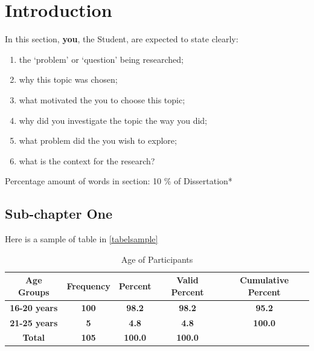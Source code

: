 
\chapter{Introduction}
\begin{spacing}{2.0}

In this section, \textbf{you}, the Student, are expected to state clearly:
\begin{enumerate}[label=(\alph*)]
    \item the `problem’ or `question’ being researched;
    \item why this topic was chosen;
    \item what motivated the you to choose this topic;
    \item why did you investigate the topic the way you did;
    \item what problem did the you wish to explore;
    \item what is the context for the research?
\end{enumerate}
Percentage amount of words in section: 10 \% of Dissertation*

\section{Sub-chapter One}


Here is a sample of table in \autoref{tabelsample}


\begin{table}[ht]
\centering
{}
{\def\arraystretch{1.5}
    \begin{tabular}{|c|c|c|c|c|} 
    \hline
    
    \textbf{Age Groups}  & \textbf{Frequency} & \textbf{Percent} & \textbf{Valid Percent} & \textbf{Cumulative Percent}  \\[5pt]
    
    \hline 
    \textbf{16-20 years} & \textbf{100}       & \textbf{98.2}    & \textbf{98.2}          & \textbf{95.2}                \\ 
    \hline
    \textbf{21-25 years} & \textbf{5}         & \textbf{4.8}     & \textbf{4.8}           & \textbf{100.0}               \\ 
    \hline
    \textbf{Total}       & \textbf{105}       & \textbf{100.0}   & \textbf{100.0}         &                              \\
    \hline
    \end{tabular}
}
\caption{Age of Participants}
\label{tabelsample}
\end{table}




\end{spacing}
